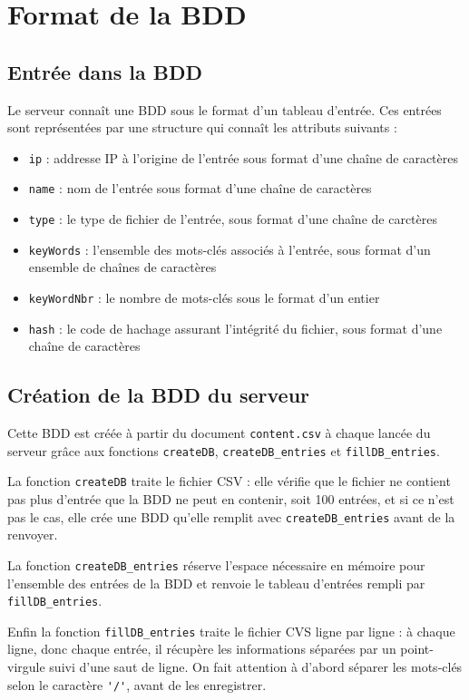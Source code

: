 \section{Format de la BDD}
\subsection{Entrée dans la BDD}
Le serveur connaît une BDD sous le format d'un tableau d'entrée. Ces entrées sont représentées par une structure qui connaît les attributs suivants :
\begin{itemize}
    \item \verb|ip| : addresse IP à l'origine de l'entrée sous format d'une chaîne de caractères
    \item \verb|name| : nom de l'entrée sous format d'une chaîne de caractères
    \item \verb|type| : le type de fichier de l'entrée, sous format d'une chaîne de carctères
    \item \verb|keyWords| : l'ensemble des mots-clés associés à l'entrée, sous format d'un ensemble de chaînes de caractères
    \item \verb|keyWordNbr| : le nombre de mots-clés sous le format d'un entier
    \item \verb|hash| : le code de hachage assurant l'intégrité du fichier, sous format d'une chaîne de caractères
\end{itemize}

\subsection{Création de la BDD du serveur}
Cette BDD est créée à partir du document \verb|content.csv| à chaque lancée du serveur grâce aux fonctions \verb|createDB|, \verb|createDB_entries| et \verb|fillDB_entries|.
\vskip 0.25cm

La fonction \verb|createDB| traite le fichier CSV : elle vérifie que le fichier ne contient pas plus d'entrée que la BDD ne peut en contenir, soit 100 entrées, et si ce n'est pas le cas, elle crée une BDD qu'elle remplit avec \verb|createDB_entries| avant de la renvoyer.
\vskip 0.25cm

La fonction \verb|createDB_entries| réserve l'espace nécessaire en mémoire pour l'ensemble des entrées de la BDD et renvoie le tableau d'entrées rempli par \verb|fillDB_entries|.
\vskip 0.25cm

Enfin la fonction \verb|fillDB_entries| traite le fichier CVS ligne par ligne : à chaque ligne, donc chaque entrée, il récupère les informations séparées par un point-virgule suivi d'une saut de ligne. On fait attention à d'abord séparer les mots-clés selon le caractère \verb|'/'|, avant de les enregistrer. 

